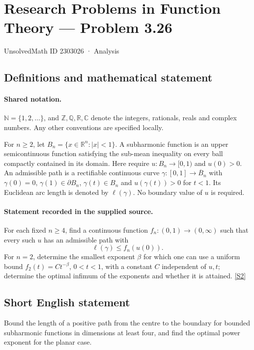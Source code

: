 \documentclass[11pt]{book}
\newcommand{\sref}[2]{\hyperlink{source:#1:#2}{[S#2]}}
\begin{document}
\setcounter{section}{2303025}
\section{Research Problems in Function Theory — Problem 3.26}\label{2303026}
{\small\sffamily UnsolvedMath ID 2303026 · Analysis}
\subsection{Definitions and mathematical statement}

\paragraph{Shared notation.}$\mathbb N=\{1,2,\ldots\}$, and $\mathbb Z,\mathbb Q,\mathbb R,\mathbb C$ denote the integers, rationals, reals and complex numbers. Any other conventions are specified locally.


For $n\ge2$, let $B_n=\{x\in\mathbb R^n:|x|<1\}$. A subharmonic function is an upper semicontinuous function satisfying the sub-mean inequality on every ball compactly contained in its domain. Here require $u:B_n\to[0,1)$ and $u(0)>0$. An admissible path is a rectifiable continuous curve $\gamma:[0,1]\to\overline B_n$ with $\gamma(0)=0$, $\gamma(1)\in\partial B_n$, $\gamma(t)\in B_n$ and $u(\gamma(t))>0$ for $t<1$. Its Euclidean arc length is denoted by $\ell(\gamma)$. No boundary value of $u$ is required.
\paragraph{Statement recorded in the supplied source.}
For each fixed $n\ge4$, find a continuous function $f_n:(0,1)\to(0,\infty)$ such that every such $u$ has an admissible path with
\[\ell(\gamma)\le f_n(u(0)).\]
For $n=2$, determine the smallest exponent $\beta$ for which one can use a uniform bound $f_2(t)=Ct^{-\beta}$, $0<t<1$, with a constant $C$ independent of $u,t$; determine the optimal infimum of the exponents and whether it is attained. \sref{2303026}{2}
\subsection{Short English statement}
Bound the length of a positive path from the centre to the boundary for bounded subharmonic functions in dimensions at least four, and find the optimal power exponent for the planar case.
\end{document}
